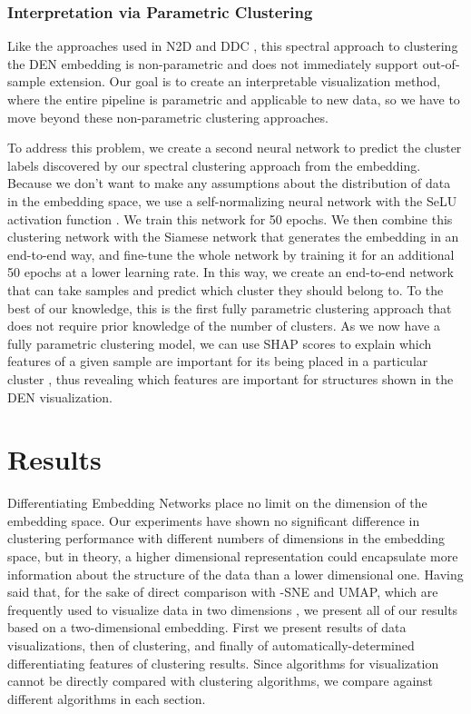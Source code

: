 \documentclass{article}
\begin{document}
\subsubsection{Interpretation via Parametric Clustering}

Like the approaches used in N2D \cite{mcconville2019n2d} and DDC \cite{ren2020deep}, this spectral approach to clustering the DEN embedding is non-parametric and does not immediately support out-of-sample extension. Our goal is to create an interpretable visualization method, where the entire pipeline is parametric and applicable to new data, so we have to move beyond these non-parametric clustering approaches.

To address this problem, we create a second neural network to predict the cluster labels discovered by our spectral clustering approach from the embedding. Because we don't want to make any assumptions about the distribution of data in the embedding space, we use a self-normalizing neural network with the SeLU activation function \cite{klambauer2017self}. We train this network for 50 epochs. We then combine this clustering network with the Siamese network that generates the embedding in an end-to-end way, and fine-tune the whole network by training it for an additional 50 epochs at a lower learning rate. In this way, we create an end-to-end network that can take samples and predict which cluster they should belong to. To the best of our knowledge, this is the first fully parametric clustering approach that does not require prior knowledge of the number of clusters. As we now have a fully parametric clustering model, we can use SHAP scores to explain which features of a given sample are important for its being placed in a particular cluster \cite{NIPS2017_7062}, thus revealing which features are important for structures shown in the DEN visualization.

\section{Results}

Differentiating Embedding Networks place no limit on the dimension of the embedding space. Our experiments have shown no significant difference in clustering performance with different numbers of dimensions in the embedding space, but in theory, a higher dimensional representation could encapsulate more information about the structure of the data than a lower dimensional one. Having said that, for the sake of direct comparison with -SNE and UMAP, which are frequently used to visualize data in two dimensions \cite{maaten2008visualizing, 2018arXivUMAP}, we present all of our results based on a two-dimensional embedding. First we present results of data visualizations, then of clustering, and finally of automatically-determined differentiating features of clustering results. Since algorithms for visualization cannot be directly compared with clustering algorithms, we compare against different algorithms in each section.
\end{document}
